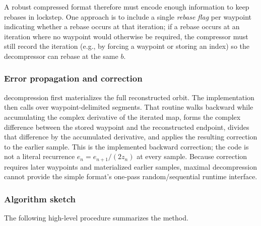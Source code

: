 A robust compressed format therefore must encode enough information to keep
rebases in lockstep.  One approach is to include a single \emph{rebase flag} per
waypoint indicating whether a rebase occurs at that iteration; if a rebase
occurs at an iteration where no waypoint would otherwise be required, the
compressor must still record the iteration (e.g., by forcing a waypoint or
storing an index) so the decompressor can rebase at the same \(b\).

\subsubsection{Error propagation and correction}

 decompression first materializes the full reconstructed orbit.
The implementation then calls  over waypoint-delimited
segments.  That routine walks backward while accumulating the complex derivative
of the iterated map, forms the complex difference between the stored waypoint
and the reconstructed endpoint, divides that difference by the accumulated
derivative, and applies the resulting correction to the earlier sample.  This
is the implemented backward correction; the code is not a literal recurrence
$e_n=e_{n+1}/(2z_n)$ at every sample.  Because correction requires later
waypoints and materialized earlier samples, maximal decompression cannot provide
the simple format's one-pass random/sequential runtime interface.

\subsubsection{Algorithm sketch}

The following high-level procedure summarizes the method.

